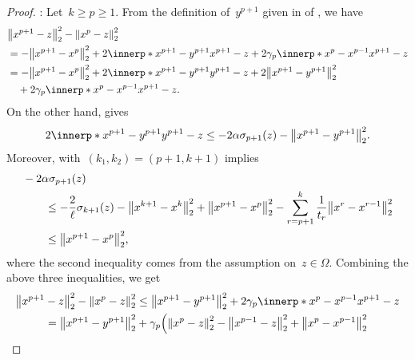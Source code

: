 \documentclass[../main]{subfiles}
\begin{document}
\begin{proof}
    :
    Let~$k \ge p \ge 1$.
    From the definition of~$y^{p + 1}$ given in  of , we have
    \begin{equation}
        \begin{split}
            &\norm*{x^{p + 1} - z}_2^2 - \norm*{x^p - z}_2^2 \\
            &= - \norm*{x^{p + 1} - x^p}_2^2 + 2 \innerp*{x^{p + 1} - y^{p + 1}}{x^{p + 1} - z} + 2 \gamma_p \innerp*{x^p - x^{p - 1}}{x^{p + 1} - z} \\
            &= - \norm*{x^{p + 1} - x^p}_2^2 + 2 \innerp*{x^{p + 1} - y^{p + 1}}{y^{p + 1} - z} + 2 \norm*{x^{p + 1} - y^{p + 1}}_2^2 \\
            &\quad + 2 \gamma_p \innerp*{x^p - x^{p - 1}}{x^{p + 1} - z}
            .   \end{split}
    \end{equation}
    On the other hand,  gives
    \begin{equation}
        2 \innerp*{x^{p + 1} - y^{p + 1}}{y^{p + 1} - z} \le - 2 \alpha \sigma_{p + 1}(z) - \norm*{x^{p + 1} - y^{p + 1}}_2^2
        .\end{equation}
    Moreover,  with~$(k_1, k_2) = (p + 1, k + 1)$ implies
    \begin{equation}
        \begin{split}
            \MoveEqLeft
            - 2 \alpha \sigma_{p + 1}(z) \\
            &\le - \frac{2}{\ell} \sigma_{k + 1}(z) - \norm*{x^{k + 1} - x^k}_2^2 + \norm*{x^{p + 1} - x^p}_2^2 - \sum_{r = p + 1}^{k} \frac{1}{t_r}\norm*{x^r - x^{r - 1}}_2^2 \\
            &\le \norm*{x^{p + 1} - x^p}_2^2
            ,\end{split}
    \end{equation}
    where the second inequality comes from the assumption on~$z \in \Omega$.
    Combining the above three inequalities, we get
    \begin{multline}
        \norm*{x^{p + 1} - z}_2^2 - \norm*{x^p - z}_2^2 \le \norm*{x^{p + 1} - y^{p + 1}}_2^2 + 2 \gamma_p \innerp*{x^p - x^{p - 1}}{x^{p + 1} - z} \\
        = \norm*{x^{p + 1} - y^{p + 1}}_2^2
        + \gamma_p \Bigl( \norm*{x^p - z}_2^2 - \norm*{x^{p - 1} - z}_2^2 + \norm*{x^p - x^{p - 1}}_2^2 \\

\end{multline}
\end{proof}
\end{document}
